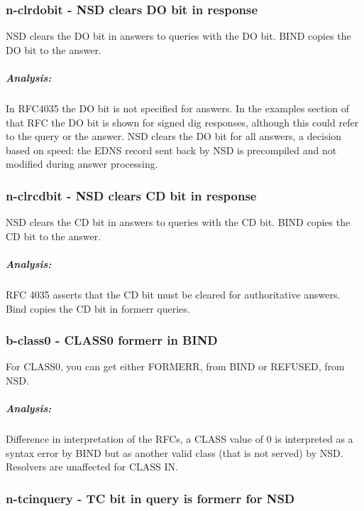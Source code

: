 \documentclass[twoside,titlepage,english]{nlnetlabs}
\begin{document}
\subsubsection{n-clrdobit - NSD clears DO bit in response}
\label{n-clrdobit}

NSD clears the DO bit in answers to queries with the DO bit. BIND copies the
DO bit to the answer.

\vspace{-8pt}\subparagraph{Analysis:}

In RFC4035\cite{rfc4035} the DO bit is not specified for answers. In the examples section
of that RFC the DO bit is shown for signed dig responses, although this could 
refer to the query or the answer. NSD clears the DO bit for all answers, a 
decision based on speed: the EDNS record sent back by NSD is precompiled and
not modified during answer processing.


\subsubsection{n-clrcdbit - NSD clears CD bit in response}
\label{n-clrcdbit}

NSD clears the CD bit in answers to queries with the CD bit. BIND copies the
CD bit to the answer.

\vspace{-8pt}\subparagraph{Analysis:}

RFC 4035\cite{rfc4035} asserts that the CD bit must be cleared for 
authoritative answers. Bind copies the CD bit in formerr queries.


\subsubsection{b-class0 - CLASS0 formerr in BIND}
\label{b-class0}

For CLASS0, you can get either FORMERR, from BIND or REFUSED, from NSD.

\vspace{-8pt}\subparagraph{Analysis:}

Difference in interpretation of the RFCs, a CLASS value of 0 is interpreted
as a syntax error by BIND but as another valid class (that is not served)
by NSD. Resolvers are unaffected for CLASS IN.


\subsubsection{n-tcinquery - TC bit in query is formerr for NSD}
\label{n-tcinquery}
\end{document}
